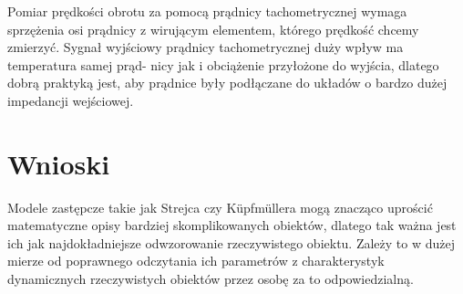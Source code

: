 \documentclass{article}
\begin{document}
Pomiar prędkości obrotu za pomocą prądnicy tachometrycznej wymaga sprzężenia osi prądnicy z wirującym elementem,
którego prędkość chcemy zmierzyć. Sygnał wyjściowy prądnicy tachometrycznej duży wpływ ma temperatura samej prąd-
nicy jak i obciążenie przyłożone do wyjścia, dlatego dobrą praktyką jest, aby prądnice były podłączane do układów o
bardzo dużej impedancji wejściowej.

\section{Wnioski}

Modele zastępcze takie jak Strejca czy Küpfmüllera mogą znacząco uprościć matematyczne opisy bardziej skomplikowanych
obiektów, dlatego tak ważna jest ich jak najdokładniejsze odwzorowanie rzeczywistego obiektu. Zależy to w dużej mierze
od poprawnego odczytania ich parametrów z charakterystyk dynamicznych rzeczywistych obiektów przez osobę za to
odpowiedzialną.
\end{document}
